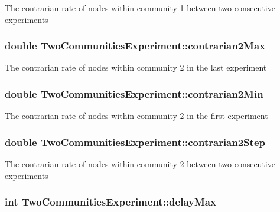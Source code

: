 The contrarian rate of nodes within community 1 between two consecutive experiments \hypertarget{class_two_communities_experiment_ab62dc7711b0acc972341bebfe14979f0}{
\subsubsection[{contrarian2\-Max}]{\setlength{\rightskip}{0pt plus 5cm}double Two\-Communities\-Experiment\-::contrarian2\-Max}}\label{class_two_communities_experiment_ab62dc7711b0acc972341bebfe14979f0}
The contrarian rate of nodes within community 2 in the last experiment \hypertarget{class_two_communities_experiment_a249455fc220b534837f794e6d4e3d520}{
\subsubsection[{contrarian2\-Min}]{\setlength{\rightskip}{0pt plus 5cm}double Two\-Communities\-Experiment\-::contrarian2\-Min}}\label{class_two_communities_experiment_a249455fc220b534837f794e6d4e3d520}
The contrarian rate of nodes within community 2 in the first experiment \hypertarget{class_two_communities_experiment_a26d60430432743c9314ae2eb52a88627}{
\subsubsection[{contrarian2\-Step}]{\setlength{\rightskip}{0pt plus 5cm}double Two\-Communities\-Experiment\-::contrarian2\-Step}}\label{class_two_communities_experiment_a26d60430432743c9314ae2eb52a88627}
The contrarian rate of nodes within community 2 between two consecutive experiments \hypertarget{class_two_communities_experiment_ab71b1171faa83b900ea3fdac52e4e74c}{
\subsubsection[{delay\-Max}]{\setlength{\rightskip}{0pt plus 5cm}int Two\-Communities\-Experiment\-::delay\-Max}}\label{class_two_communities_experiment_ab71b1171faa83b900ea3fdac52e4e74c}
